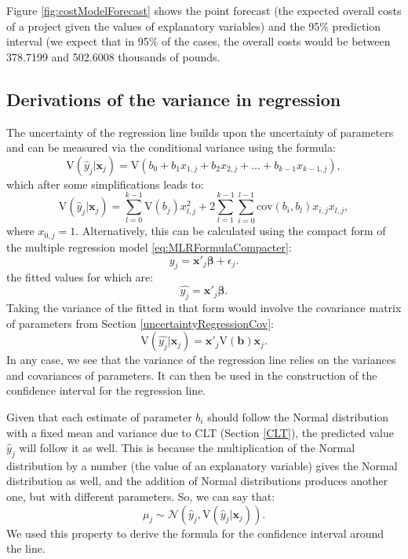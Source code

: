 \documentclass[
]{book}
\theoremstyle{definition}
\theoremstyle{definition}
\theoremstyle{definition}
\theoremstyle{definition}
\theoremstyle{remark}
\begin{document}
Figure \ref{fig:costModelForecast} shows the point forecast (the expected overall costs of a project given the values of explanatory variables) and the 95\% prediction interval (we expect that in 95\% of the cases, the overall costs would be between 378.7199 and 502.6008 thousands of pounds.

\subsection{Derivations of the variance in regression}\label{uncertaintyRegressionLineMaths}

The uncertainty of the regression line builds upon the uncertainty of parameters and can be measured via the conditional variance using the formula:
\begin{equation*}
\mathrm{V}(\hat{y}_j| \mathbf{x}_j) = \mathrm{V}(b_0 + b_1 x_{1,j} + b_2 x_{2,j} + \dots + b_{k-1} x_{k-1,j}) ,
\label{eq:regressionLineUncertaintyVariance01}
\end{equation*}
which after some simplifications leads to:
\begin{equation}
\mathrm{V}(\hat{y}_j| \mathbf{x}_j) = \sum_{l=0}^{k-1} \mathrm{V}(b_j) x^2_{l,j} + 2 \sum_{l=1}^{k-1} \sum_{i=0}^{l-1}  \mathrm{cov}(b_i,b_l) x_{i,j} x_{l,j} ,
\label{eq:regressionLineUncertaintyVariance02}
\end{equation}
where \(x_{0,j}=1\). Alternatively, this can be calculated using the compact form of the multiple regression model \eqref{eq:MLRFormulaCompacter}:
\begin{equation*}
y_j = \mathbf{x}'_j \boldsymbol{\beta} + \epsilon_j .
\end{equation*}
the fitted values for which are:
\begin{equation*}
\hat{y_j} = \mathbf{x}'_j \boldsymbol{\beta} .
\end{equation*}
Taking the variance of the fitted in that form would involve the covariance matrix of parameters from Section \ref{uncertaintyRegressionCov}:
\begin{equation*}
\mathrm{V}(\hat{y_j}| \mathbf{x}_j) = \mathbf{x}'_j \mathrm{V}({\boldsymbol{b}}) \mathbf{x}_j.
\end{equation*}
In any case, we see that the variance of the regression line relies on the variances and covariances of parameters. It can then be used in the construction of the confidence interval for the regression line.

Given that each estimate of parameter \(b_i\) should follow the Normal distribution with a fixed mean and variance due to CLT (Section \ref{CLT}), the predicted value \(\hat{y}_j\) will follow it as well. This is because the multiplication of the Normal distribution by a number (the value of an explanatory variable) gives the Normal distribution as well, and the addition of Normal distributions produces another one, but with different parameters. So, we can say that:
\begin{equation*}
\mu_j \sim \mathcal{N}(\hat{y}_j, \mathrm{V}(\hat{y}_j| \mathbf{x}_j)) .
\end{equation*}
We used this property to derive the formula for the confidence interval around the line.
\end{document}
